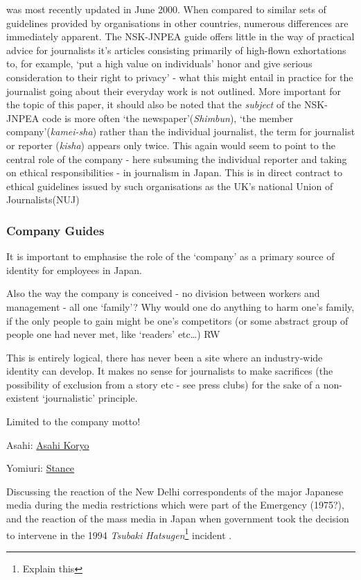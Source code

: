 \documentclass[11pt, headings=normal]{scrartcl}
\begin{document}
was most recently updated in June 2000. When compared to similar sets of
guidelines provided by organisations in other countries, numerous
differences are immediately apparent. The NSK-JNPEA guide offers little
in the way of practical advice for journalists it's articles consisting
primarily of high-flown exhortations to, for example, `put a high value
on individuals' honor and give serious consideration to their right to
privacy' - what this might entail in practice for the journalist going
about their everyday work is not outlined. More important for the topic
of this paper, it should also be noted that the \emph{subject} of the
NSK-JNPEA code is more often `the newspaper'(\emph{Shimbun}), `the
member company'(\emph{kamei-sha}) rather than the individual journalist,
the term for journalist or reporter (\emph{kisha}) appears only twice.
This again would seem to point to the central role of the company - here
subsuming the individual reporter and taking on ethical responsibilities
- in journalism in Japan. This is in direct contract to ethical
guidelines issued by such organisations as the UK's national Union of
Journalists(NUJ)

\hypertarget{company-guides}{%
\subsubsection{Company Guides}\label{company-guides}}

It is important to emphasise the role of the `company' as a primary
source of identity for employees in Japan.

Also the way the company is conceived - no division between workers and
management - all one `family'? Why would one do anything to harm one's
family, if the only people to gain might be one's competitors (or some
abstract group of people one had never met, like `readers' etc\ldots{})
{RW}

This is entirely logical, there has never been a site where an
industry-wide identity can develop. It makes no sense for journalists to
make sacrifices (the possibility of exclusion from a story etc - see
press clubs) for the sake of a non-existent `journalistic' principle.

Limited to the company motto!

Asahi:
\href{http://www.asahi.com/corporate/guide/outline/11051801}{Asahi
Koryo}

Yomiuri:
\href{https://info.yomiuri.co.jp/group/stance/index.html}{Stance}

Discussing the reaction of the New Delhi correspondents of the major
Japanese media during the media restrictions which were part of the
Emergency (1975?), and the reaction of the mass media in Japan when
government took the decision to intervene in the 1994 \emph{Tsubaki
Hatsugen}\footnote{Explain this} incident \autocite{Berger:1995}.
\end{document}
